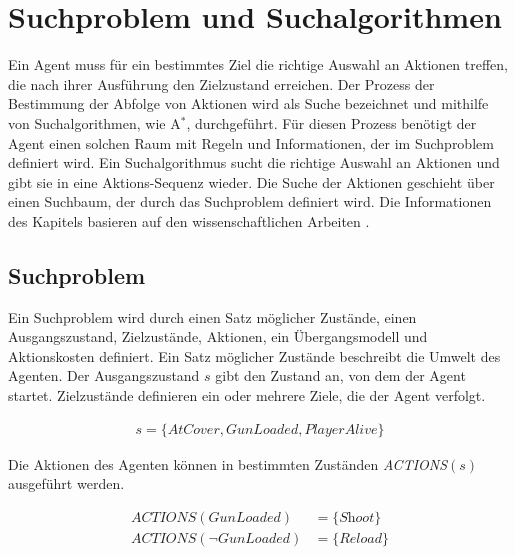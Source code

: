 
\chapter{Suchproblem und Suchalgorithmen}
\label{chap:suchproblem und suchalgorithmen}

Ein Agent muss f\"{u}r ein bestimmtes Ziel die richtige Auswahl an Aktionen treffen, die nach ihrer Ausf\"{u}hrung den Zielzustand erreichen. Der Prozess der Bestimmung der Abfolge von Aktionen wird als Suche bezeichnet und mithilfe von Suchalgorithmen, wie A$^*$, durchgef\"{u}hrt. F\"{u}r diesen Prozess ben\"{o}tigt der Agent einen solchen Raum mit Regeln und Informationen, der im Suchproblem definiert wird. Ein Suchalgorithmus sucht die richtige Auswahl an Aktionen und gibt sie in eine Aktions-Sequenz wieder. Die Suche der Aktionen geschieht \"{u}ber einen Suchbaum, der durch das Suchproblem definiert wird. Die Informationen des Kapitels basieren auf den wissenschaftlichen Arbeiten \autocite{RN2020, 4082128, Felner2011}.

\section{Suchproblem}
\label{chap:suchproblem}

Ein Suchproblem wird durch einen Satz m\"{o}glicher Zust\"{a}nde, einen Ausgangszustand, Zielzust\"{a}nde, Aktionen, ein \"{U}bergangsmodell und Aktionskosten definiert. Ein Satz m\"{o}glicher Zust\"{a}nde beschreibt die Umwelt des Agenten. Der Ausgangszustand $s$ gibt den Zustand an, von dem der Agent startet. Zielzust\"{a}nde definieren ein oder mehrere Ziele, die der Agent verfolgt.


\begin{align}
	s = \{\textit{AtCover}, \textit{GunLoaded}, \textit{PlayerAlive}\}
\end{align}


Die Aktionen des Agenten k\"{o}nnen in bestimmten Zust\"{a}nden \textit{ACTIONS}$(s)$ ausgef\"{u}hrt werden.

\begin{align}
	\textit{ACTIONS}(\textit{GunLoaded}) &= \{\textit{Shoot}\} \\
	\textit{ACTIONS}(\lnot \textit{GunLoaded}) &= \{\textit{Reload}\}
\end{align}

